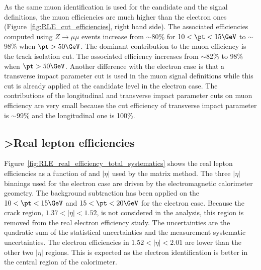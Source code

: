 As the same muon identification is used for the candidate and the signal definitions, the muon efficiencies are much higher than the electron ones (Figure~\ref{fig:RLE_cut_efficiencies}, right hand side).
The associated efficiencies computed using $Z\to \mu \mu$ events increase from $\sim$80\% for $10<\pt<15 \GeV$ to $\sim$98\% when $\pt>50 \GeV$.
The dominant contribution to the muon efficiency is the track isolation cut. The associated efficiency increases from $\sim$82\% to 98\% when $\pt>50 \GeV$.
Another difference with the electron case is that a transverse impact parameter cut is used in the muon signal definitions while this cut is already applied at the candidate level in the electron case.
The contributions of the longitudinal and transverse impact parameter cuts on muon efficiency are very small because the cut efficiency of transverse impact parameter is $\sim$99\% and the longitudinal one is 100\%.



\subsection{>Real lepton efficiencies}
\label{subsubsec:RLE_results}

Figure~\ref{fig:RLE_real_efficiency_total_systematics} shows the real lepton efficiencies as a function of \pt and $|\eta|$ used by the matrix method.
The three $|\eta|$ binnings used for the electron case are driven by the electromagnetic calorimeter geometry.
The background subtraction has been applied on the $10<\pt<15 \GeV$ and $15<\pt<20 \GeV$ for the electron case.
Because the crack region, $1.37<|\eta|<1.52$, is not considered in the analysis, this region is removed from the real electron efficiency study.
The uncertainties are the quadratic sum of the statistical uncertainties and the measurement systematic uncertainties.
The electron efficiencies in $1.52<|\eta|<2.01$ are lower than the other two $|\eta|$ regions.
This is expected as the electron identification is better in the central region of the calorimeter. 

